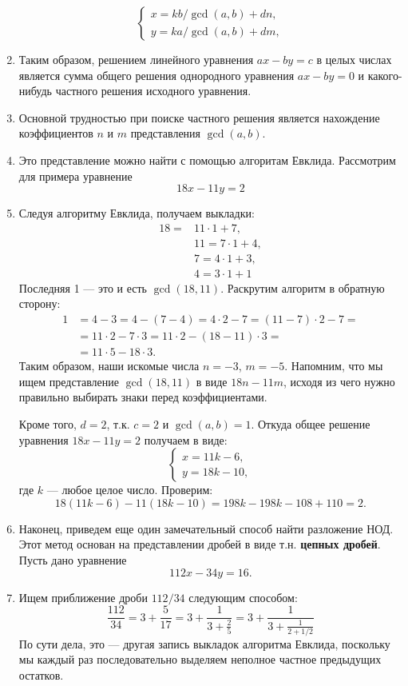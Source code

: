 \begin{enumerate}
$$\begin{cases}
x  =kb/\gcd(a,b) + dn, \\
y  =ka/\gcd(a,b) + dm,
\end{cases}
$$
\item Таким образом, решением линейного уравнения $ax-by=c$ в целых числах является сумма общего решения однородного уравнения $ax-by=0$ и какого-нибудь частного решения исходного уравнения.
\item Основной трудностью при поиске частного решения является нахождение коэффициентов $n$ и $m$ представления $\gcd(a,b)$.
\item Это представление можно найти с помощью алгоритам Евклида. Рассмотрим для примера уравнение
$$
18x-11y=2
$$
\item Следуя алгоритму Евклида, получаем выкладки:
\begin{align*}
18 = & 11\cdot 1+7,\\
   & 11 = 7\cdot 1 + 4, \\
   & 7 = 4\cdot 1 + 3, \\
   & 4 = 3\cdot 1 + 1
\end{align*}
Последняя 1 --- это и есть $\gcd(18,11)$. Раскрутим алгоритм в обратную сторону:
\begin{align*}
1 & = 4-3 = 4 - (7-4) = 4\cdot 2-7 = (11-7)\cdot 2-7 =\\
  & = 11\cdot 2-7\cdot 3 = 11\cdot 2 - (18-11)\cdot 3 =\\
  & = 11\cdot 5 - 18\cdot 3.
\end{align*}
Таким образом, наши искомые числа $n=-3$, $m=-5$. Напомним, что мы ищем представление $\gcd(18,11)$ в виде $18n-11m$, исходя из чего нужно правильно выбирать знаки перед коэффициентами.

Кроме того, $d=2$, т.к. $c=2$ и $\gcd(a,b)=1$. Откуда общее решение уравнения $18x-11y=2$ получаем в виде:
$$
\begin{cases}
x  =11k - 6, \\
y  =18k - 10,
\end{cases}
$$
где $k$ --- любое целое число. Проверим:
$$
18(11k - 6) - 11(18k - 10) = 198k-198k - 108 + 110 =2.
$$
\item Наконец, приведем еще один замечательный способ найти разложение НОД. Этот метод основан на представлении дробей в виде т.н. \textbf{цепных дробей}. Пусть дано уравнение
$$
112x-34y=16.
$$
\item Ищем приближение дроби $112/34$ следующим способом:
$$
\frac{112}{34} = 3 + \frac{5}{17} = 3 + \frac{1}{3+\frac{2}{5}} = 
3 + \frac{1}{3 + \frac{1}{2+1/2}}
$$
По сути дела, это --- другая запись выкладок алгоритма Евклида, поскольку мы каждый раз последовательно выделяем неполное частное предыдущих остатков.


\end{enumerate}
